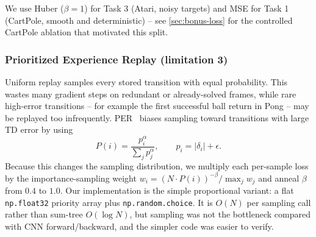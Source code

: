 \documentclass[10pt,twocolumn,letterpaper]{article}
\begin{document}
We use Huber ($\beta = 1$) for Task 3 (Atari, noisy targets) and MSE for Task 1 (CartPole, smooth and deterministic) -- see \cref{sec:bonus-loss} for the controlled CartPole ablation that motivated this split.

\subsubsection{Prioritized Experience Replay (limitation 3)}

Uniform replay samples every stored transition with equal probability. This wastes many gradient steps on redundant or already-solved frames, while rare high-error transitions -- for example the first successful ball return in Pong -- may be replayed too infrequently. PER~\cite{schaul2016per} biases sampling toward transitions with large TD error by using
\[
    P(i) = \frac{p_i^\alpha}{\sum_j p_j^\alpha}, \qquad p_i = |\delta_i| + \epsilon.
\]
Because this changes the sampling distribution, we multiply each per-sample loss by the importance-sampling weight $w_i = (N \cdot P(i))^{-\beta} / \max_j w_j$ and anneal $\beta$ from $0.4$ to $1.0$. Our implementation is the simple proportional variant: a flat \texttt{np.float32} priority array plus \texttt{np.random.choice}. It is $O(N)$ per sampling call rather than sum-tree $O(\log N)$, but sampling was not the bottleneck compared with CNN forward/backward, and the simpler code was easier to verify.
\end{document}
